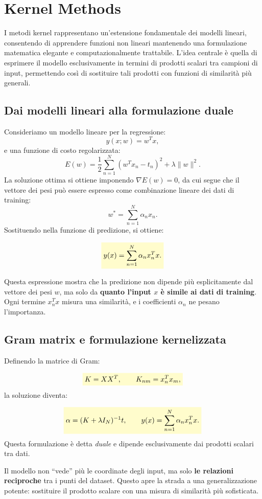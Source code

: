\documentclass[a4paper,12pt]{report}
\newcommand{\highlight}[1]{%
\colorbox{yellow!20}{$\displaystyle #1$}%
}
\begin{document}
\chapter{Kernel Methods}

I metodi kernel rappresentano un’estensione fondamentale dei modelli lineari, consentendo di apprendere funzioni non lineari mantenendo una formulazione matematica elegante e computazionalmente trattabile. L’idea centrale è quella di esprimere il modello esclusivamente in termini di prodotti scalari tra campioni di input, permettendo così di sostituire tali prodotti con funzioni di similarità più generali.

\section{Dai modelli lineari alla formulazione duale}

Consideriamo un modello lineare per la regressione:
\[
y(x;w) = w^T x,
\]
e una funzione di costo regolarizzata:
\[
E(w) = \frac{1}{2}\sum_{n=1}^{N}(w^T x_n - t_n)^2 + \lambda \|w\|^2.
\]
La soluzione ottima si ottiene imponendo $\nabla E(w)=0$, da cui segue che il vettore dei pesi può essere espresso come combinazione lineare dei dati di training:
\[
w^* = \sum_{n=1}^{N} \alpha_n x_n.
\]
Sostituendo nella funzione di predizione, si ottiene:

\[
\highlight{
y(x) = \sum_{n=1}^{N} \alpha_n x_n^T x.}
\]

Questa espressione mostra che la predizione non dipende più esplicitamente dal vettore dei pesi $w$, ma solo da \textbf{quanto l’input $x$ è simile ai dati di training}. Ogni termine $x_n^T x$ misura una similarità, e i coefficienti $\alpha_n$ ne pesano l’importanza.

\section{Gram matrix e formulazione kernelizzata}

Definendo la matrice di Gram:

\[
\highlight{
K = XX^T,
\qquad K_{nm} = x_n^T x_m,}
\]
la soluzione diventa:

\[
\highlight{
\alpha = (K + \lambda I_N)^{-1} t,
\qquad
y(x) = \sum_{n=1}^{N} \alpha_n x_n^T x.}
\]
Questa formulazione è detta \emph{duale} e dipende esclusivamente dai prodotti scalari tra dati.

Il modello non “vede” più le coordinate degli input, ma solo \textbf{le relazioni reciproche} tra i punti del dataset. Questo apre la strada a una generalizzazione potente: sostituire il prodotto scalare con una misura di similarità più sofisticata.
\end{document}
